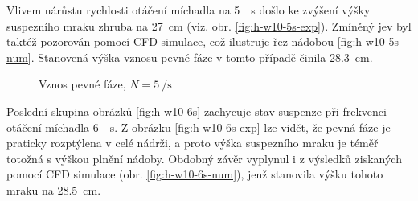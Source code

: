 Vlivem nárůstu rychlosti otáčení míchadla na \SI{5}{\per\second} došlo ke zvýšení výšky suspezního mraku zhruba na \SI{27}{\centi\meter} (viz. obr. \ref{fig:h-w10-5s-exp}). Zmíněný jev byl taktéž pozorován pomocí CFD simulace, což ilustruje řez nádobou \ref{fig:h-w10-5s-num}. Stanovená výška vznosu pevné fáze v tomto případě činila \SI{28.3}{\centi\meter}. 
\newpage

\begin{figure}[t!]
 \centering
  \qquad 
  \caption{Vznos pevné fáze, $N=\SI{5}{\per\second}$}
  \label{fig:h-w10-5s}
\end{figure}
Poslední skupina obrázků \ref{fig:h-w10-6s} zachycuje stav suspenze při frekvenci otáčení míchadla \SI{6}{\per\second}. Z obrázku \ref{fig:h-w10-6s-exp} lze vidět, že pevná fáze je praticky rozptýlena v celé nádrži, a proto výška suspezního mraku je téměř totožná s výškou plnění nádoby. Obdobný závěr vyplynul i z výsledků ziskaných pomocí CFD simulace (obr. \ref{fig:h-w10-6s-num}), jenž stanovila výšku tohoto mraku na \SI{28.5}{\centi\meter}.

